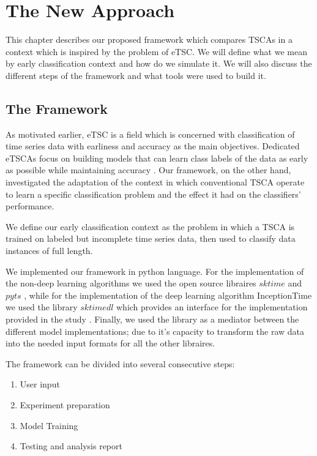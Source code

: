 \chapter{The New Approach}
\label{ChapterNewApproah}
This chapter describes our proposed framework which compares TSCAs in a context which is inspired by the problem of eTSC.
We will define what we mean by early classification context and how do we simulate it. We will also discuss the different steps
of the framework and what tools were used to build it.

\section{The Framework}
\label{SectionNewFramework}
As motivated earlier, eTSC is a field which is concerned with classification of time series data with earliness and accuracy
as the main objectives. Dedicated eTSCAs focus on building models that can learn class labels of the data as early as possible
while maintaining accuracy \cite{mori2017early}.
Our framework, on the other hand, investigated the adaptation of the context in which conventional TSCA operate to learn a specific
classification problem and the effect it had on the classifiers' performance.

We define our early classification context as the problem in which a TSCA is trained on labeled but incomplete time series data, then
used to classify data instances of full length.

We implemented our framework in python language.
For the implementation of the non-deep learning algorithms we used the open source libraires $sktime$ \cite{loning2019sktime} and $pyts$ \cite{JMLR:v21:19-763},
while for the implementation of the deep learning algorithm InceptionTime we used the library $sktimedl$ which provides an interface for the implementation provided
in the study \cite{fawaz2020inceptiontime}. Finally, we used the library \cite{JMLR:v21:20-091} as a mediator between the different model implementations; due to it's
capacity to transform the raw data into the needed input formats for all the other libraires.

The framework can be divided into several consecutive steps:
\begin{enumerate}
    \item User input
    \item Experiment preparation
    \item Model Training
    \item Testing and analysis report
\end{enumerate}

